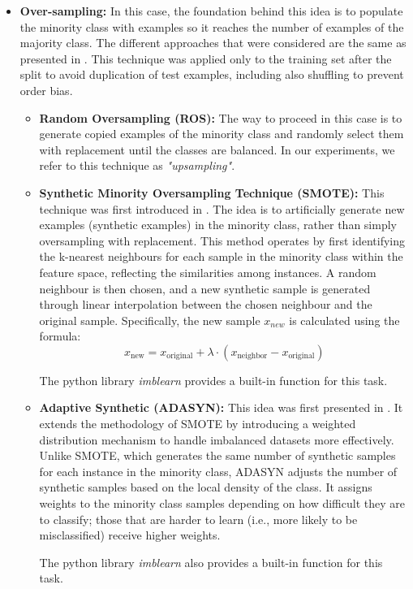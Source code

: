 \begin{itemize}
    \item \textbf{Over-sampling:} In this case, the foundation behind this idea is to populate the minority class with examples so it reaches the number of examples of the majority class. The different approaches that were considered are the same as presented in \cite{rathpisey-2019}. This technique was applied only to the training set after the split to avoid duplication of test examples, including also shuffling to prevent order bias.
        \begin{itemize}
            \item \textbf{Random Oversampling (ROS):} The way to proceed in this case is to generate copied examples of the minority class and randomly select them with replacement until the classes are balanced. In our experiments, we refer to this technique as \textit{"upsampling"}.
            
            \item \textbf{Synthetic Minority Oversampling Technique (SMOTE):} This technique was first introduced in \cite{chawla-2002}. The idea is to artificially generate new examples (synthetic examples) in the minority class, rather than simply oversampling with replacement. This method operates by first identifying the k-nearest neighbours for each sample in the minority class within the feature space, reflecting the similarities among instances. A random neighbour is then chosen, and a new synthetic sample is generated through linear interpolation between the chosen neighbour and the original sample. Specifically, the new sample $x_{new}$ is calculated using the formula:
            \begin{equation}
                x_{\text{new}} = x_{\text{original}} + \lambda \cdot (x_{\text{neighbor}} - x_{\text{original}})
            \end{equation}
            
            The python library \textit{imblearn} provides a built-in function for this task.
            
            \item \textbf{Adaptive Synthetic (ADASYN):} This idea was first presented in \cite{he-2008}. It extends the methodology of SMOTE by introducing a weighted distribution mechanism to handle imbalanced datasets more effectively. Unlike SMOTE, which generates the same number of synthetic samples for each instance in the minority class, ADASYN adjusts the number of synthetic samples based on the local density of the class. It assigns weights to the minority class samples depending on how difficult they are to classify; those that are harder to learn (i.e., more likely to be misclassified) receive higher weights. 
            
            The python library \textit{imblearn} also provides a built-in function for this task.
        \end{itemize}
\end{itemize}


